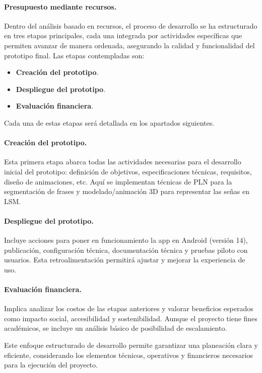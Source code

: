 \paragraph{\textbf{Presupuesto mediante recursos.}} 
Dentro del análisis basado en recursos, el proceso de desarrollo se ha estructurado en tres etapas principales, cada una integrada por actividades específicas que permiten avanzar de manera ordenada, asegurando la calidad y funcionalidad del prototipo final. Las etapas contempladas son:

\begin{itemize}
	\item \textbf{Creación del prototipo}. 
	\item \textbf{Despliegue del prototipo}.
	\item \textbf{Evaluación financiera}. 
\end{itemize}

Cada una de estas etapas será detallada en los apartados siguientes.

\paragraph{\textbf{Creación del prototipo.}} 
Esta primera etapa abarca todas las actividades necesarias para el desarrollo inicial del prototipo: definición de objetivos, especificaciones técnicas, requisitos, diseño de animaciones, etc. Aquí se implementan técnicas de PLN para la segmentación de frases y modelado/animación 3D para representar las señas en LSM.

\paragraph{\textbf{Despliegue del prototipo.}} 
Incluye acciones para poner en funcionamiento la app en Android (versión 14), publicación, configuración técnica, documentación técnica y pruebas piloto con usuarios. Esta retroalimentación permitirá ajustar y mejorar la experiencia de uso.

\paragraph{\textbf{Evaluación financiera.}} 
Implica analizar los costos de las etapas anteriores y valorar beneficios esperados como impacto social, accesibilidad y sostenibilidad. Aunque el proyecto tiene fines académicos, se incluye un análisis básico de posibilidad de escalamiento.

Este enfoque estructurado de desarrollo permite garantizar una planeación clara y eficiente, considerando los elementos técnicos, operativos y financieros necesarios para la ejecución del proyecto.


